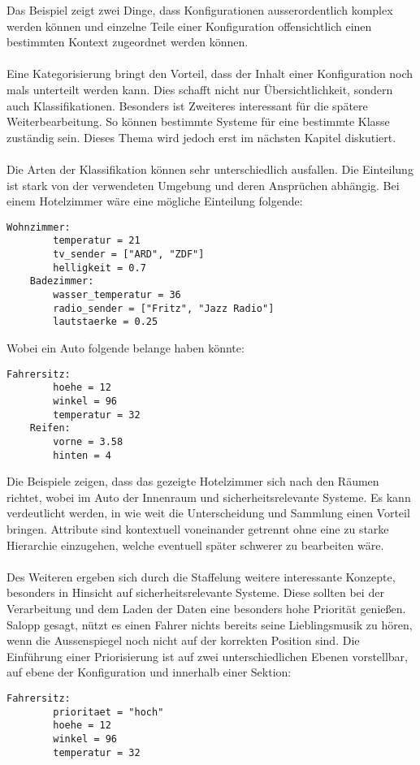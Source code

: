 Das Beispiel zeigt zwei Dinge, dass Konfigurationen ausserordentlich komplex werden können und einzelne Teile einer Konfiguration offensichtlich einen bestimmten Kontext zugeordnet werden können. 
\\\\
Eine Kategorisierung bringt den Vorteil, dass der Inhalt einer Konfiguration noch mals unterteilt werden kann. Dies schafft nicht nur Übersichtlichkeit, sondern auch Klassifikationen. Besonders ist Zweiteres interessant für die spätere Weiterbearbeitung. So können bestimmte Systeme für eine bestimmte Klasse zuständig sein. Dieses Thema wird jedoch erst im nächsten Kapitel diskutiert. 
\\\\
Die Arten der Klassifikation können sehr unterschiedlich ausfallen. Die Einteilung ist stark von der verwendeten Umgebung und deren Ansprüchen abhängig. Bei einem Hotelzimmer wäre eine mögliche Einteilung folgende: 

\lstset{language=bash}
\begin{lstlisting}[caption=Mögliche Sektionen innerhalb einer Hotelkonfiguratione, captionpos=b]
  Wohnzimmer: 
		temperatur = 21
		tv_sender = ["ARD", "ZDF"]
		helligkeit = 0.7
	Badezimmer: 
		wasser_temperatur = 36
		radio_sender = ["Fritz", "Jazz Radio"]
		lautstaerke = 0.25
\end{lstlisting}

Wobei ein Auto folgende belange haben könnte:

\lstset{language=bash}
\begin{lstlisting}[caption=Mögliche Sektionen innerhalb einer KFZ-Konfiguration, captionpos=b]
   	Fahrersitz:
		hoehe = 12
		winkel = 96
		temperatur = 32
	Reifen: 
		vorne = 3.58
		hinten = 4
\end{lstlisting}


Die Beispiele zeigen, dass das gezeigte Hotelzimmer sich nach den Räumen richtet, wobei im Auto der Innenraum und sicherheitsrelevante Systeme. Es kann verdeutlicht werden, in wie weit die Unterscheidung und Sammlung einen Vorteil bringen. Attribute sind kontextuell voneinander getrennt ohne eine zu starke Hierarchie einzugehen, welche eventuell später schwerer zu bearbeiten wäre.
\\\\
Des Weiteren ergeben sich durch die Staffelung weitere interessante Konzepte, besonders in Hinsicht auf sicherheitsrelevante Systeme. Diese sollten bei der Verarbeitung und dem Laden der Daten eine besonders hohe Priorität genießen. Salopp gesagt, nützt es einen Fahrer nichts bereits seine Lieblingsmusik zu hören, wenn die Aussenspiegel noch nicht auf der korrekten Position sind. Die Einführung einer Priorisierung ist auf zwei unterschiedlichen Ebenen vorstellbar, auf ebene der Konfiguration und innerhalb einer Sektion: 
\lstset{language=bash}
\begin{lstlisting}[caption=Priorisierung von Sektionen, captionpos=b]
   	Fahrersitz:
		prioritaet = "hoch"
		hoehe = 12
		winkel = 96
		temperatur = 32
\end{lstlisting}



